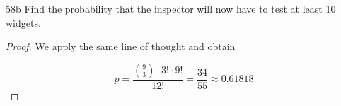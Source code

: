 \begin{exercise}{58b}
    Find the probability that the inspector will now have to test at least 10 widgets.
\end{exercise}

\begin{proof}
    We apply the same line of thought and obtain

    $$p = \frac{{9 \choose 3} \cdot 3! \cdot 9!}{12!} = \frac{34}{55} \approx 0.61818$$

\end{proof}

\newpage

